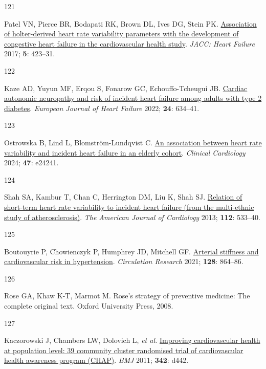 \documentclass[
  a4paper,
  headsepline=true,
  open=any]{scrbook}
\newlength{\cslhangindent}
\newlength{\csllabelwidth}
\newlength{\cslentryspacingunit} %
\newenvironment{CSLReferences}[2] %
 {%
  \setlength{\parindent}{0pt}
  \ifodd #1
  \let\oldpar\par
  \def\par{\hangindent=\cslhangindent\oldpar}
  \fi
  \setlength{\parskip}{#2\cslentryspacingunit}
 }%
 {}
\newcommand{\CSLLeftMargin}[1]{\parbox[t]{\csllabelwidth}{#1}}
\newcommand{\CSLRightInline}[1]{\parbox[t]{\linewidth - \csllabelwidth}{#1}\break}
\begin{document}
\begin{CSLReferences}{0}{0}
\leavevmode{}%
\CSLLeftMargin{121 }%
\CSLRightInline{Patel VN, Pierce BR, Bodapati RK, Brown DL, Ives DG,
Stein PK. \href{https://doi.org/10.1016/j.jchf.2016.12.015}{Association
of holter-derived heart rate variability parameters with the development
of congestive heart failure in the cardiovascular health study}.
\emph{JACC: Heart Failure} 2017; \textbf{5}: 423--31.}

\leavevmode{}%
\CSLLeftMargin{122 }%
\CSLRightInline{Kaze AD, Yuyun MF, Erqou S, Fonarow GC,
Echouffo-Tcheugui JB. \href{https://doi.org/10.1002/ejhf.2432}{Cardiac
autonomic neuropathy and risk of incident heart failure among adults
with type 2 diabetes}. \emph{European Journal of Heart Failure} 2022;
\textbf{24}: 634--41.}

\leavevmode{}%
\CSLLeftMargin{123 }%
\CSLRightInline{Ostrowska B, Lind L, Blomström-Lundqvist C.
\href{https://doi.org/10.1002/clc.24241}{An association between heart
rate variability and incident heart failure in an elderly cohort}.
\emph{Clinical Cardiology} 2024; \textbf{47}: e24241.}

\leavevmode{}%
\CSLLeftMargin{124 }%
\CSLRightInline{Shah SA, Kambur T, Chan C, Herrington DM, Liu K, Shah
SJ. \href{https://doi.org/10.1016/j.amjcard.2013.04.018}{Relation of
short-term heart rate variability to incident heart failure (from the
multi-ethnic study of atherosclerosis)}. \emph{The American Journal of
Cardiology} 2013; \textbf{112}: 533--40.}

\leavevmode{}%
\CSLLeftMargin{125 }%
\CSLRightInline{Boutouyrie P, Chowienczyk P, Humphrey JD, Mitchell GF.
\href{https://doi.org/10.1161/CIRCRESAHA.121.318061}{Arterial stiffness
and cardiovascular risk in hypertension}. \emph{Circulation Research}
2021; \textbf{128}: 864--86.}

\leavevmode{}%
\CSLLeftMargin{126 }%
\CSLRightInline{Rose GA, Khaw K-T, Marmot M. Rose's strategy of
preventive medicine: The complete original text. Oxford University
Press, 2008.}

\leavevmode{}%
\CSLLeftMargin{127 }%
\CSLRightInline{Kaczorowski J, Chambers LW, Dolovich L, \emph{et al.}
\href{https://doi.org/10.1136/bmj.d442}{Improving cardiovascular health
at population level: 39 community cluster randomised trial of
cardiovascular health awareness program (CHAP)}. \emph{BMJ} 2011;
\textbf{342}: d442.}


\end{CSLReferences}
\end{document}
